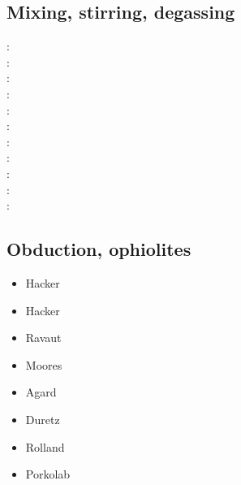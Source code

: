 \subsection{Mixing, stirring, degassing} 

\begin{scriptsize}
\nineteeneightyfour: \cite{olyb84}\\
\nineteenninety: \cite{ketu90}\\
\nineteenninetysix: \cite{pelt96}\\
\nineteenninetynine: \cite{cori99}\\
\twothousandone: \cite{huke01}\\
\twothousandtwo: \cite{vahb02}\\
\twothousandthree: \cite{fasa03}\cite{vabh03}\\
\twothousandfive: \cite{colt05}\\
\twothousandseven: \cite{gogc07}\cite{nake07}\cite{vabh07}\\
\twothousandeleven: \cite{lemj11}\cite{saad11}\\
\twothousandeighteen: \cite{onzh18}
\end{scriptsize}

\subsection{Obduction, ophiolites}
 

\begin{scriptsize}
\begin{itemize}
\item[\nineteenninety] Hacker \cite{hack90}
\item[\nineteenninetyone] Hacker \cite{hack91}
\item[\nineteenninetyseven] Ravaut \etal \cite{rabh97}
\item[\twothousand] Moores \etal \cite{mokd00}
\item[\twothousandfourteen] Agard \etal \cite{agzf14}
\item[\twothousandsixteen] Duretz \etal \cite{duay16}
\item[\twothousandtwenty] Rolland \etal \cite{rohb20}
\item[\twothousandtwentyone] Porkolab \etal \cite{pody21}
\end{itemize}
\end{scriptsize}

